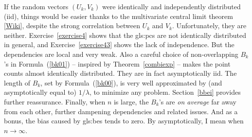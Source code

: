 \documentclass[10pt]{article}
\begin{document}
\begin{Exercise}
If the random vectors $(U_k,V_k)$ were identically and independently distributed (iid), things would be easier thanks to
 the \textcolor{index}{multivariate central limit theorem} [\href{https://en.wikipedia.org/wiki/Central_limit_theorem#Multidimensional_CLT}{Wiki}], despite the strong correlation between $U_k$ and $V_k$. Unfortunately, they are neither. Exercise~\ref{exercise4} shows that the
\glspl{gls:pc} are not identically distributed in general, and Exercise~\ref{exercise43} shows the lack of independence. But the dependencies are local and very weak.
Also a careful choice of non-overlapping $B_k$'s in Formula~(\ref{bk01}) -- inspired by Theorem~\ref{combiexp} -- makes the point counts  almost identically distributed.
They are in fact asymptotically iid. The length of $B_k$, set by Formula~(\ref{bk00}), is very well approximated by (and asymptotically equal to) $1/\lambda$, to minimize any problem.
Section~\ref{bbei} provides further reassurance. Finally, when $n$ is large, the $B_k$'s are {\em on average} far away from each other, further dampening dependencies and related issues. And as a bonus,
the bias caused by \glspl{gls:be} tends to zero.  By asymptotically, I mean when $n\rightarrow\infty$.


\end{Exercise}
\end{document}
